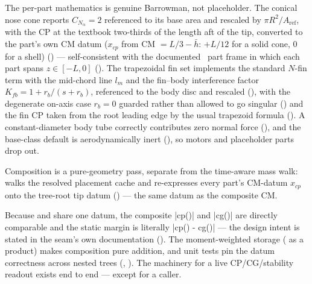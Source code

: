 The per-part mathematics is genuine Barrowman, not placeholder. The conical nose cone reports
$C_{N_\alpha} = 2$ referenced to its base area and rescaled by $\pi R^2/A_{\mathrm{ref}}$, with the
CP at the textbook two-thirds of the length aft of the tip, converted to the part's own CM datum
($x_{cp}$ from CM $= L/3 - \bar{h}$: $+L/12$ for a solid cone, $0$ for a shell)
() --- self-consistent with the documented \zfwd\ part
frame in which each part spans $z \in [-L, 0]$ (). The trapezoidal fin
set implements the standard $N$-fin term with the mid-chord line $l_m$ and the fin--body
interference factor $K_{fb} = 1 + r_b/(s + r_b)$, referenced to the body disc and rescaled
(), with the degenerate on-axis case $r_b = 0$ guarded rather than
allowed to go singular () and the fin CP taken from the root
leading edge by the usual trapezoid formula (). A constant-diameter
body tube correctly contributes zero normal force (), and the
base-class default is aerodynamically inert (), so motors and
placeholder parts drop out.

Composition is a pure-geometry pass, separate from the time-aware mass walk:
 walks the resolved placement cache and re-expresses every
part's CM-datum $x_{cp}$ onto the tree-root tip datum () --- the
same datum as the composite CM.

\begin{keyinsight}
Because  and  share one datum, the composite
\cppinline|cp()| and \cppinline|cg()| are directly comparable and the static margin is literally
\cppinline|cp() - cg()| --- the design intent is stated in the seam's own documentation
(). The moment-weighted storage ( as a product) makes
composition pure addition, and unit tests pin the datum correctness across nested trees
(, ). The
machinery for a live CP/CG/stability readout exists end to end --- except for a caller.
\end{keyinsight}

